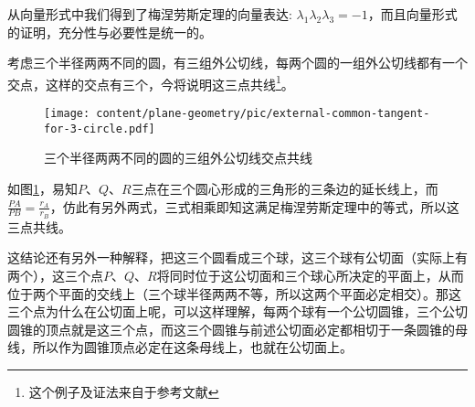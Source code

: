 从向量形式中我们得到了梅涅劳斯定理的向量表达: $\lambda_1\lambda_2\lambda_3=-1$，而且向量形式的证明，充分性与必要性是统一的。

\begin{example}
  \label{example:external-common-tangent-for-3-circle}
  考虑三个半径两两不同的圆，有三组外公切线，每两个圆的一组外公切线都有一个交点，这样的交点有三个，今将说明这三点共线\footnote{这个例子及证法来自于参考文献\cite{kuing-problem-book}}。
 
\begin{figure}[htbp]
\centering
\texttt{[image: content/plane-geometry/pic/external-common-tangent-for-3-circle.pdf]}
\caption{三个半径两两不同的圆的三组外公切线交点共线}
\label{fig:external-common-tangent-for-3-circle}
\end{figure}

如图\ref{fig:external-common-tangent-for-3-circle}，易知$P$、$Q$、$R$三点在三个圆心形成的三角形的三条边的延长线上，而$\frac{PA}{PB}=\frac{r_A}{r_B}$，仿此有另外两式，三式相乘即知这满足梅涅劳斯定理中的等式，所以这三点共线。

 这结论还有另外一种解释，把这三个圆看成三个球，这三个球有公切面（实际上有两个），这三个点$P$、$Q$、$R$将同时位于这公切面和三个球心所决定的平面上，从而位于两个平面的交线上（三个球半径两两不等，所以这两个平面必定相交）。那这三个点为什么在公切面上呢，可以这样理解，每两个球有一个公切圆锥，三个公切圆锥的顶点就是这三个点，而这三个圆锥与前述公切面必定都相切于一条圆锥的母线，所以作为圆锥顶点必定在这条母线上，也就在公切面上。
\end{example}

